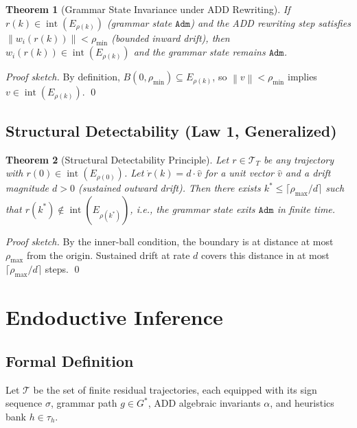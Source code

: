 \documentclass[11pt,a4paper]{article}
\theoremstyle{plain}
\newtheorem{theorem}{Theorem}[section]
\theoremstyle{definition}
\theoremstyle{remark}
\DeclareMathOperator{\interior}{int}
\newcommand{\norm}[1]{\left\|#1\right\|}
\begin{document}
\begin{theorem}[Grammar State Invariance under ADD Rewriting]
\label{thm:grammar_invariance}
  If $r(k) \in \interior(E_{\rho(k)})$ (grammar state $\mathtt{Adm}$) and the ADD rewriting
  step satisfies $\norm{w_i(r(k))} < \rho_{\min}$ (bounded inward drift), then
  $w_i(r(k)) \in \interior(E_{\rho(k)})$ and the grammar state remains $\mathtt{Adm}$.
\end{theorem}
\begin{proof}[Proof sketch]
  By definition, $B(0, \rho_{\min}) \subseteq E_{\rho(k)}$, so $\norm{v} < \rho_{\min}$ implies
  $v \in \interior(E_{\rho(k)})$. \qed
\end{proof}

\subsection{Structural Detectability (Law 1, Generalized)}

\begin{theorem}[Structural Detectability Principle]
\label{thm:law1}
  Let $r \in \mathcal{T}_T$ be any trajectory with $r(0) \in \interior(E_{\rho(0)})$.
  Let $\dot{r}(k) = d \cdot \hat{v}$ for a unit vector $\hat{v}$ and a drift magnitude $d > 0$
  (sustained outward drift). Then there exists $k^* \leq \lceil \rho_{\max} / d \rceil$ such that
  $r(k^*) \notin \interior(E_{\rho(k^*)})$, i.e., the grammar state exits $\mathtt{Adm}$ in
  finite time.
\end{theorem}
\begin{proof}[Proof sketch]
  By the inner-ball condition, the boundary is at distance at most $\rho_{\max}$ from the origin.
  Sustained drift at rate $d$ covers this distance in at most $\lceil \rho_{\max}/d \rceil$
  steps. \qed
\end{proof}

\section{Endoductive Inference}
\label{sec:endoduction}

\subsection{Formal Definition}

Let $\mathcal{T}$ be the set of finite residual trajectories, each equipped with its sign
sequence $\sigma$, grammar path $g \in G^*$, ADD algebraic invariants $\alpha$, and heuristics
bank $h \in \tau_h$.
\end{document}
